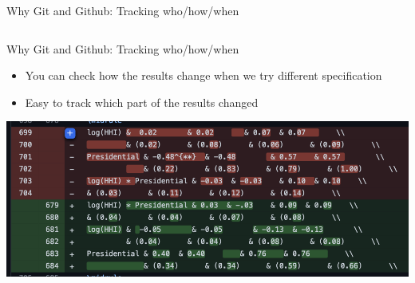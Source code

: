 \documentclass[handout,pdftex,10pt,aspectratio=169]{beamer}
\begin{document}
\begin{frame}{Why Git and Github: Tracking who/how/when}
\begin{columns}
\begin{column}{0.53\linewidth}
  \end{column}
  \end{columns}
\end{frame}

\begin{frame}{Why Git and Github: Tracking who/how/when}
  \begin{itemize}\setlength\itemsep{-3pt}
    \item You can check how the results change when we try different specification
    \item Easy to track which part of the results changed 
  \end{itemize}
  \vspace{10pt}
  \centering
  \includegraphics[width = 0.7\linewidth]{github_regression.png}
\end{frame}
\end{document}
